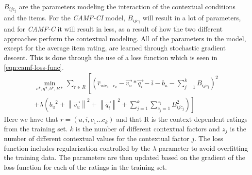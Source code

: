 $B_{ijc_j}$ are the parameters modeling the interaction of the contextual conditions and the items.
For the \textit{CAMF-CI} model, $B_{ijc_j}$ will result in a lot of parameters, and for \textit{CAMF-C} it will result in less, as a result of how the two different approaches perform the contextual modeling.
All of the parameters in the model, except for the average item rating, are learned through stochastic gradient descent.
This is done through the use of a loss function which is seen in \autoref{eqn:camf-loss-func}.
\begin{equation}
    \label{eqn:camf-loss-func}
    \begin{split}
        \min_{v*, q*, b*, B*}\sum \limits_{r \in  R}\left [ \left (  \hat{r}_{uic_1...c_k} - \vec{v_u} * \vec{q_i} - \bar{i} - b_u - \sum\limits_{j = 1}^k B_{ijc_j}\right )^2 \right. \\
        \left. + \lambda \left({b_u}^2 +{\left \| \vec{v_u} \right \|}^2  + {\left \|\vec{q_i}  \right \|}^2 + \sum\limits_{j = 1}^k \sum\limits_{c_j = 1}^{z_j} B_{ijc_j}^{2}\right ) \right ]
    \end{split}
\end{equation}
Here we have that $r = (u,i,c_1...c_k)$ and that R is the context-dependent ratings from the training set.
$k$ is the number of different contextual factors and $z_j$ is the number of different contextual values for the contextual factor $j$.
The loss function includes regularization controlled by the $\lambda$ parameter to avoid overfitting the training data.
The parameters are then updated based on the gradient of the loss function for each of the ratings in the training set.
